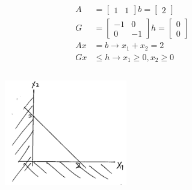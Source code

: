 \begin{example}
	\begin{align*}A &= 
	\begin{bmatrix}
	1 & 1
	\end{bmatrix}
	b = 
	\begin{bmatrix}
	2
	\end{bmatrix}\\
	G &= 
	\begin{bmatrix}
	-1 & 0\\
	0 & -1
	\end{bmatrix}
	h = 
	\begin{bmatrix}
	0\\
	0
	\end{bmatrix}\\
	Ax &= b \rightarrow x_1 + x_2 = 2\\
	Gx &\leq h \rightarrow x_1 \geq 0, x_2\geq 0
	\end{align*}
	
	
	\begin{figure}
	\centering
	\includegraphics[width=2.1in,height=2.1in]{figures/ch07/figure1012_2.png}
	\end{figure}
\end{example}









